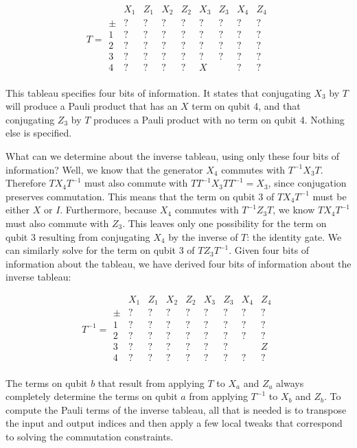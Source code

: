 \documentclass[onecolumn,unpublished]{quantumarticle}
\theoremstyle{definition}
\theoremstyle{definition}
\theoremstyle{definition}
\begin{document}
$$
T = \begin{array}{r|cc|cc|cc|cc}
    & X_1 & Z_1 & X_2 & Z_2 & X_3 & Z_3 & X_4 & Z_4  \\
    \hline
    \pm & ? & ? & ? & ? & ? & ? & ? & ? \\
    1 & ? & ? & ? & ? & ? & ? & ? & ? \\
    2 & ? & ? & ? & ? & ? & ? & ? & ? \\
    3 & ? & ? & ? & ? & ? & ? & ? & ? \\
    4 & ? & ? & ? & ? & X &   & ? & ? \\
\end{array}
$$

This tableau specifies four bits of information.
It states that conjugating $X_3$ by $T$ will produce a Pauli product that has an $X$ term on qubit 4, and that conjugating $Z_3$ by $T$ produces a Pauli product with no term on qubit 4.
Nothing else is specified.

What can we determine about the inverse tableau, using only these four bits of information?
Well, we know that the generator $X_4$ commutes with $T^{-1} X_3 T$.
Therefore $T X_4 T^{-1}$ must also commute with $T T^{-1} X_3 T T^{-1} = X_3$, since conjugation preserves commutation.
This means that the term on qubit 3 of $T X_4 T^{-1}$ must be either $X$ or $I$.
Furthermore, because $X_4$ commutes with $T^{-1} Z_3 T$, we know $T X_4 T^{-1}$ must also commute with $Z_3$.
This leaves only one possibility for the term on qubit 3 resulting from conjugating $X_4$ by the inverse of $T$: the identity gate.
We can similarly solve for the term on qubit 3 of $T Z_3 T^{-1}$.
Given four bits of information about the tableau, we have derived four bits of information about the inverse tableau:

$$
T^{-1} = \begin{array}{r|cc|cc|cc|cc}
    & X_1 & Z_1 & X_2 & Z_2 & X_3 & Z_3 & X_4 & Z_4  \\
    \hline
    \pm & ? & ? & ? & ? & ? & ? & ? & ? \\
    1 & ? & ? & ? & ? & ? & ? & ? & ? \\
    2 & ? & ? & ? & ? & ? & ? & ? & ? \\
    3 & ? & ? & ? & ? & ? & ? &   & Z \\
    4 & ? & ? & ? & ? & ? & ? & ? & ? \\
\end{array}
$$

The terms on qubit $b$ that result from applying $T$ to $X_a$ and $Z_a$ always completely determine the terms on qubit $a$ from applying $T^{-1}$ to $X_b$ and $Z_b$.
To compute the Pauli terms of the inverse tableau, all that is needed is to transpose the input and output indices and then apply a few local tweaks that correspond to solving the commutation constraints.
\end{document}

